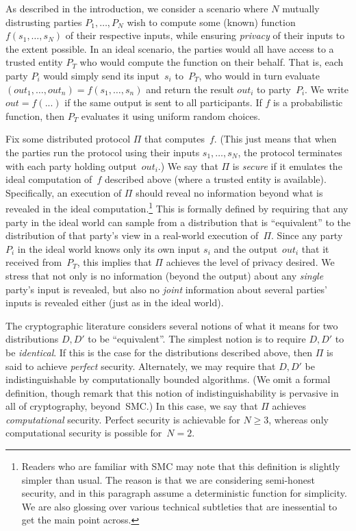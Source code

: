 \documentclass[10pt]{sigplanconf}
\newcommand{\jnote}[1]{\textcolor{blue}{{\bf JK} -- \emph{#1}}}
\newcommand{\jnote}[1]{}
\begin{document}
As described in the introduction, we consider a scenario where $N$
mutually distrusting parties $P_1, \ldots, P_N$ wish to compute some
(known) function $f(s_1, \ldots, s_N)$ of their respective inputs,
while ensuring \emph{privacy} of their inputs to the extent possible.
In an ideal scenario, the parties would all have access to a trusted
entity $P_T$ who would compute the function on their behalf. That is,
each party $P_i$ would simply send its input~$s_i$ to~$P_T$, who would
in turn evaluate $(out_1, \ldots, out_n) = f(s_1, \ldots, s_n)$ and
return the result $out_i$ to party~$P_i$. We write $out
= f(...)$ if the same output is sent to all participants.  If $f$ is a
probabilistic function, then $P_T$ evaluates it using uniform random
choices.

Fix some distributed protocol $\Pi$ that computes~$f$. (This just
means that when the parties run the protocol using their inputs $s_1,
\ldots, s_N$, the protocol terminates with each party holding
output~$out_i$.) We say that $\Pi$ is \emph{secure} if it emulates the
ideal computation of~$f$ described above (where a trusted entity is
available). Specifically, an execution of $\Pi$ should reveal no
information beyond what is revealed in the ideal
computation.\footnote{Readers who are familiar with SMC may note that
  this definition is slightly simpler than usual. The reason is that
  we are considering semi-honest security, and in this paragraph
  assume a deterministic function for simplicity. We are also glossing
  over various technical subtleties that are inessential to get the
  main point across.} This is formally defined by requiring that any
party in the ideal world can sample from a distribution that is
``equivalent'' to the distribution of that party's view in a
real-world execution
of~$\Pi$. %
Since any party $P_i$ in the ideal world knows only its own input $s_i$ and the output~$out_i$ that it received
from~$P_T$, this implies that $\Pi$ achieves the level of privacy desired. We stress that not only is no information
(beyond the output) about any \emph{single} party's input is revealed, but also no \emph{joint} information about
several parties' inputs is revealed either (just as in the ideal world).

The cryptographic literature considers several notions of what it means for two distributions $D, D'$ to be
``equivalent''. The simplest notion is to require $D, D'$ to be \emph{identical}. If this is the case for
the distributions described above, then $\Pi$ is said to achieve \emph{perfect} security. Alternately, we may
require that $D, D'$ be indistinguishable by computationally bounded algorithms. (We omit a formal definition,
though remark that this notion of indistinguishability is pervasive in all of cryptography, beyond~SMC.)
In this case, we say that $\Pi$ achieves \emph{computational} security.
Perfect security is achievable for $N \geq 3$, whereas only computational security is possible for~$N=2$.
\end{document}
